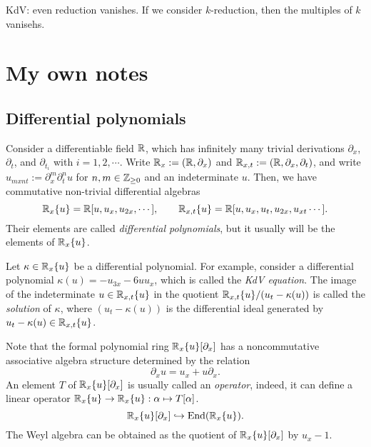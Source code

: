 \documentclass{../../../small}
\begin{document}
KdV: even reduction vanishes.
If we consider $k$-reduction, then the multiples of $k$ vanisehs.


\newpage

\section*{My own notes}

\subsection*{Differential polynomials}

\begin{prb}
Consider a differentiable field $\mathbb{R}$, which has infinitely many trivial derivations $\partial_x$, $\partial_t$, and $\partial_{t_i}$ with $i=1,2,\cdots$.
Write $\mathbb{R}_x:=(\mathbb{R},\partial_x)$ and $\mathbb{R}_{x,t}:=(\mathbb{R},\partial_x,\partial_t)$, and write $u_{mxnt}:=\partial_x^m\partial_t^nu$ for $n,m\in\mathbb{Z}_{\ge0}$ and an indeterminate $u$.
Then, we have commutative non-trivial differential algebras
\[\mathbb{R}_x\{u\}=\mathbb{R}[u,u_x,u_{2x},\cdots],\qquad\mathbb{R}_{x,t}\{u\}=\mathbb{R}[u,u_x,u_t,u_{2x},u_{xt}\cdots].\]
Their elements are called \emph{differential polynomials}, but it usually will be the elements of $\mathbb{R}_x\{u\}$.

Let $\kappa\in\mathbb{R}_x\{u\}$ be a differential polynomial.
For example, consider a differential polynomial $\kappa(u)=-u_{3x}-6uu_x$, which is called the \emph{KdV equation}.
The image of the indeterminate $u\in\mathbb{R}_{x,t}\{u\}$ in the quotient $\mathbb{R}_{x,t}\{u\}/(u_t-\kappa(u))$ is called the \emph{solution} of $\kappa$, where $(u_t-\kappa(u))$ is the differential ideal generated by $u_t-\kappa(u)\in\mathbb{R}_{x,t}\{u\}$.
\end{prb}

\begin{prb}
Note that the formal polynomial ring $\mathbb{R}_x\{u\}[\partial_x]$ has a noncommutative associative algebra structure determined by the relation
\[\partial_xu=u_x+u\partial_x.\]
An element $T$ of $\mathbb{R}_x\{u\}[\partial_x]$ is usually called an \emph{operator}, indeed, it can define a linear operator $\mathbb{R}_x\{u\}\to\mathbb{R}_x\{u\}:\alpha\mapsto T[\alpha]$.
\[\mathbb{R}_x\{u\}[\partial_x]\hookrightarrow\operatorname{End}(\mathbb{R}_x\{u\}).\]
The Weyl algebra can be obtained as the quotient of $\mathbb{R}_x\{u\}[\partial_x]$ by $u_x-1$.
\end{prb}
\end{document}
